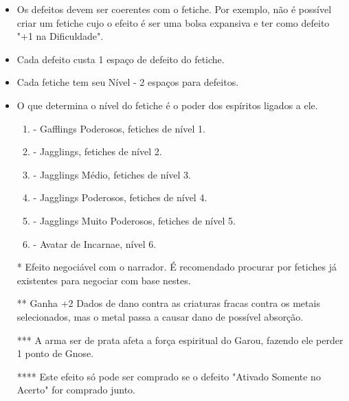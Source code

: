 \begin{itemize} [noitemsep]
	\item Os defeitos devem ser coerentes com o fetiche. Por exemplo, não é possível criar um fetiche cujo o efeito é ser uma bolsa expansiva e ter como defeito "+1 na Dificuldade".
    
	\item Cada defeito custa 1 espaço de defeito do fetiche.

	\item Cada fetiche tem seu Nível - 2 espaços para defeitos.
    
    \item O que determina o nível do fetiche é o poder dos espíritos ligados a ele. 
    \begin{enumerate} [noitemsep]  
    \item - Gafflings Poderosos, fetiches de nível 1.
    \item - Jagglings, fetiches de nível 2.
    \item - Jagglings Médio, fetiches de nível 3.
    \item - Jagglings Poderosos, fetiches de nível 4.
    \item - Jagglings Muito Poderosos, fetiches de nível 5.
	\item - Avatar de Incarnae, nível 6.
    \end{enumerate}
    
	\item[*] Efeito negociável com o narrador. É recomendado procurar por fetiches já existentes para negociar com base nestes.

	\item[**] Ganha +2 Dados de dano contra as criaturas fracas contra os metais selecionados, mas o metal passa a causar dano de possível absorção.

	\item[***] A arma ser de prata afeta a força espiritual do Garou, fazendo ele perder 1 ponto de Gnose.

	\item[****] Este efeito só pode ser comprado se o defeito "Ativado Somente no Acerto" for comprado junto.

\end{itemize}